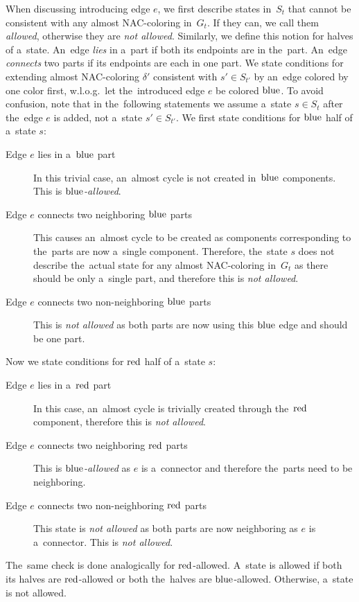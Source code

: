 When discussing \IntroduceEdgeNode{} introducing edge \( e \),
we first describe states in~\( S_{t} \)
that cannot be consistent with any almost NAC-coloring in~\( G_t \).
If they can, we call them \emph{allowed}, otherwise they are \emph{not allowed}.
Similarly, we define this notion for halves of a~state.
%
An~edge \emph{lies} in a~part if both its endpoints are in the~part.
An~edge \emph{connects} two parts if its endpoints are each in one part.
%
We state conditions for extending almost NAC-coloring \( \delta' \)
consistent with \( s' \in S_{t'} \)
by an~edge colored by one color first,
w.l.o.g.\ let the~introduced edge \( e \) be colored \( \text{blue} \).
%
To avoid confusion, note that in the~following statements we assume
a~state \( s \in S_t \) after the~edge \( e \) is added, not a~state \( s' \in S_{t'} \).
%
We first state conditions for \( \text{blue} \) half of a~state \( s \):
%
\begin{description}
	\item[Edge \( e \) lies in a~\( \text{blue} \) part]
	      In this trivial case, an~almost cycle is not created in~\( \text{blue} \) components.
	      This is \emph{\( \text{blue} \)-allowed}.
	\item[Edge \( e \) connects two neighboring \( \text{blue} \) parts]
	      This causes an~almost cycle to be created as
	      components corresponding to the~parts
	      are now a~single component.
	      Therefore, the~state \( s \) does not describe
	      the~actual state for any almost NAC-coloring in~\( G_t \)
	      as there should be only a~single part, and therefore this is \emph{not allowed}.
	\item[Edge \( e \) connects two non-neighboring \( \text{blue} \) parts]
	      This is \emph{not allowed} as both parts
	      are now using this \( \text{blue} \) edge and should be one part.
\end{description}
%
Now we state conditions for \( \text{red} \) half of a~state \( s \):
%
\begin{description}
	\item[Edge \( e \) lies in a~\( \text{red} \) part]
	      In this case, an~almost cycle is trivially created
	      through the~\( \text{red} \) component,
	      therefore this is \emph{not allowed}.
	\item[Edge \( e \) connects two neighboring \( \text{red} \) parts]
	      This is \emph{\( \text{blue} \)-allowed} as \( e \) is a~connector and
	      therefore the~parts need to be neighboring.
	\item[Edge \( e \) connects two non-neighboring \( \text{red} \) parts]
	      This state is \emph{not allowed} as both parts
	      are now neighboring as \( e \) is a~connector.
	      This is \emph{not allowed}.
\end{description}
%
The~same check is done analogically for \( \text{red} \)-allowed.
A~state is allowed if both its halves are \( \text{red} \)-allowed or
both the~halves are \( \text{blue} \)-allowed.
Otherwise, a~state is not allowed.

